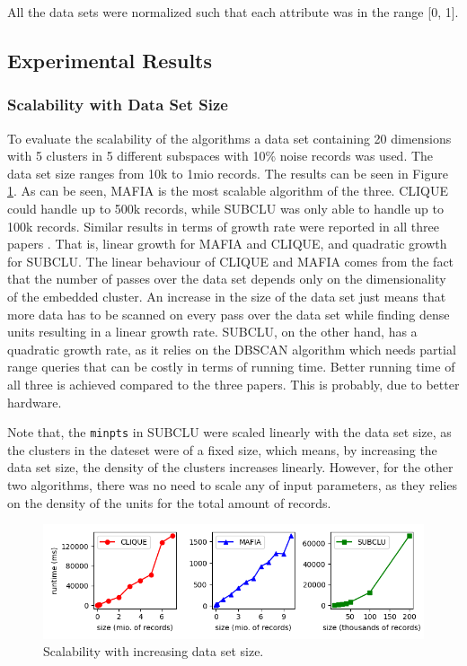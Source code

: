 All the data sets were normalized such that each attribute was in the range [0, 1].

\subsection{Experimental Results}

\subsubsection{Scalability with Data Set Size}
To evaluate the scalability of the algorithms a data set containing 20 dimensions with 5 clusters in 5 different subspaces with 10\% noise records was used. The data set size ranges from 10k to 1mio records. The results can be seen in Figure \ref{fig:dataset_size_vs_runtime}. As can be seen, MAFIA is the most scalable algorithm of the three. CLIQUE could handle up to 500k records, while SUBCLU was only able to handle up to 100k records. Similar results in terms of growth rate were reported in all three papers \cite{mafia,clique,subclu}. That is, linear growth for MAFIA and CLIQUE, and quadratic growth for SUBCLU. The linear behaviour of CLIQUE and MAFIA comes from the fact that the number of passes over the data set depends only on the dimensionality of the embedded cluster. An increase in the size of the data set just means that more data has to be scanned on every pass over the data set while finding dense units resulting in a linear growth rate. SUBCLU, on the other hand, has a quadratic growth rate, as it relies on the DBSCAN algorithm which needs partial range queries that can be costly in terms of running time. Better running time of all three is achieved compared to the three papers. This is probably, due to better hardware.

Note that, the \texttt{minpts} in SUBCLU were scaled linearly with the data set size, as the clusters in the dateset were of a fixed size, which means, by increasing the data set size, the density of the clusters increases linearly. However, for the other two algorithms, there was no need to scale any of input parameters, as they relies on the density of the units for the total amount of records.
\begin{figure}[H]
    \vspace*{-0.5cm}
    \centering
    \includegraphics[scale=0.45]{figures/dataset_size_vs_runtime.png}
    \caption{Scalability with increasing data set size.}
    \label{fig:dataset_size_vs_runtime}
    \vspace*{-0.5cm}
\end{figure}

